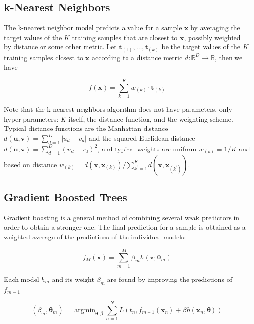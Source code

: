 \documentclass[a4paper]{book}
\DeclareMathOperator*{\argmin}{argmin}
\begin{document}
\subsection{k-Nearest Neighbors}
The k-nearest neighbor model \cite{knn} predicts a value for a sample $\bm x$ by averaging the target values of the $K$ training samples that are closest to $\bm x$, possibly weighted by distance or some other metric. Let $\bm t_{(1)},\ldots,\bm t_{(k)}$ be the target values of the $K$ training samples closest to $\bm x$ according to a distance metric $d:\mathbb{R}^D\rightarrow\mathbb{R}$, then we have

\begin{equation}
f(\bm x)=\sum_{k=1}^K w_{(k)}\cdot\bm t_{(k)}
\end{equation}


Note that the k-nearest neighbors algorithm does not have parameters, only hyper\hyp{}parameters: $K$ itself, the distance function, and the weighting scheme. Typical distance functions are the Manhattan distance $d(\bm u,\bm v)=\sum_{d=1}^D\vert u_d-v_d\vert$ and the squared Euclidean distance $d(\bm u,\bm v)=\sum_{d=1}^D(u_d-v_d)^2$, and typical weights are uniform $w_{(k)}=1/K$ and based on distance $w_{(k)}=d(\bm x,\bm x_{(k)})/\sum_{k^\prime=1}^K d(\bm x,\bm x_{(k^\prime)})$.

\subsection{Gradient Boosted Trees}
Gradient boosting \citep{gradientboosting} is a general method of combining several weak predictors in order to obtain a stronger one. The final prediction for a sample is obtained as a weighted average of the predictions of the individual models:

\begin{equation}
\label{eq:gboost}
f_M(\bm x)=\sum_{m=1}^M \beta_m h(\bm x;\bm\theta_m)
\end{equation}

Each model $h_m$ and its weight $\beta_m$ are found by improving the predictions of $f_{m-1}$:

\begin{equation}
\label{eq:gboostjoint}
(\beta_m, \bm\theta_m)=\argmin_{\bm\theta,\beta}\sum_{n=1}^N L\left(
t_n, f_{m-1}(\bm x_n)+\beta h(\bm x_n,\bm\theta)
\right)
\end{equation}
\end{document}
